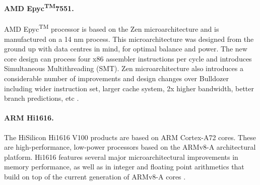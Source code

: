 \paragraph{AMD Epyc\texorpdfstring{\textsuperscript{TM}}\ 7551.}
AMD Epyc\textsuperscript{TM} processor is based on the Zen microarchitecture and is manufactured on a 14 nm process. This microarchitecture was designed from the ground up with data centres in mind, for optimal balance and power. The new core design can process four x86 assembler instructions per cycle and introduces Simultaneous Multithreading (SMT).
Zen microarchitecture also introduces a considerable number of improvements and design changes over Bulldozer
including wider instruction set, larger cache system, 2x higher bandwidth, better branch predictions, etc
\cite{2019:epyc, now:epyc}.

\paragraph{ARM Hi1616.}
The HiSilicon Hi1616 V100 products are based on ARM Cortex-A72 cores. These are high-performance, low-power processors based on the ARMv8-A architectural platform. %
Hi1616 features several major microarchitectural improvements in memory performance, as well as in integer and floating point arithmetics that build on top of the current generation of ARMv8-A cores \cite{2017:hi1616,2019:hi1616}.

